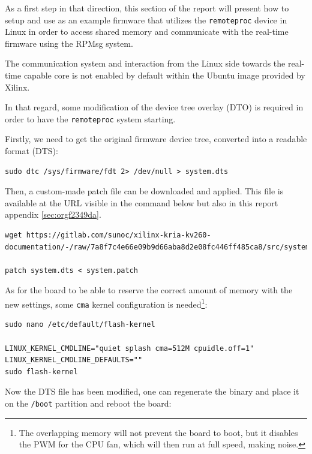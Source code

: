 \documentclass[10pt]{article}
\begin{document}
As a first step in that direction, this section of the report
will present how to setup and use as an example firmware that utilizes the
\texttt{remoteproc} device in Linux in order to access shared memory
and communicate with the real-time firmware using the RPMsg system.

The communication system and interaction from the Linux side towards the real-time capable core
is not enabled by default within the Ubuntu image provided by Xilinx.

In that regard, some modification of the device tree overlay (DTO) is required in order to have
the \texttt{remoteproc} system starting.

Firstly, we need to get the original firmware device tree, converted
into a readable format (DTS):

\begin{verbatim}
sudo dtc /sys/firmware/fdt 2> /dev/null > system.dts
\end{verbatim}

Then, a custom-made patch file can be downloaded and applied.
This file is available at the URL visible in the command below
but also in this report appendix \ref{sec:orgf2349da}.

\begin{verbatim}
wget https://gitlab.com/sunoc/xilinx-kria-kv260-documentation/-/raw/7a8f7c4e66e09b9d66aba8d2e08fc446ff485ca8/src/system.patch

patch system.dts < system.patch
\end{verbatim}


As for the board to be able to reserve the correct amount of memory with the new settings, some
\texttt{cma} kernel configuration is needed\footnote{The overlapping memory will not prevent the board to boot,
but it disables the PWM for the CPU fan, which will then run at full speed, making noise.}:

\begin{verbatim}
sudo nano /etc/default/flash-kernel

LINUX_KERNEL_CMDLINE="quiet splash cma=512M cpuidle.off=1"
LINUX_KERNEL_CMDLINE_DEFAULTS=""
sudo flash-kernel
\end{verbatim}

Now the DTS file has been modified, one can regenerate the binary and place it on the \texttt{/boot} partition
and reboot the board:
\end{document}
